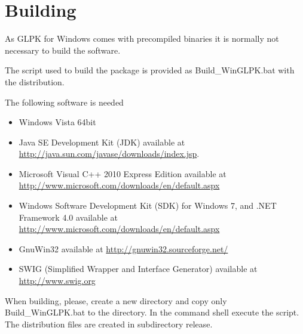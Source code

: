 \documentclass[a4paper,11pt]{report}
\begin{document}
\chapter{Building}
As GLPK for Windows comes with precompiled binaries it is normally not necessary to build the software.

The script used to build the package is provided as Build\_WinGLPK.bat with the distribution.

The following software is needed
\begin{itemize}
\item Windows Vista 64bit
\item Java SE Development Kit (JDK) available at \linebreak\href{http://java.sun.com/javase/downloads/index.jsp}{http://java.sun.com/javase/downloads/index.jsp}.
\item Microsoft Visual C++ 2010 Express Edition available at \linebreak\href{http://www.microsoft.com/downloads/en/default.aspx}{http://www.microsoft.com/downloads/en/default.aspx}
\item Windows Software Development Kit (SDK) for Windows 7, and .NET Framework 4.0 available at \href{http://www.microsoft.com/downloads/en/default.aspx}{http://www.microsoft.com/downloads/en/default.aspx}
\item GnuWin32 available at \href{http://gnuwin32.sourceforge.net/}{http://gnuwin32.sourceforge.net/}
\item SWIG (Simplified Wrapper and Interface Generator) available at \linebreak\href{http://www.swig.org}{http://www.swig.org}
\end{itemize}
When building, please, create a new directory and copy only Build\_WinGLPK.bat to the directory. In the command shell execute the script. The distribution files are created in subdirectory release.
\end{document}
